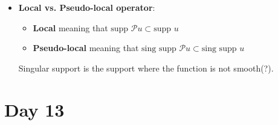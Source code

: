 \documentclass{article}
\begin{document}
\begin{itemize}
    \item \textbf{Local vs. Pseudo-local operator}:
    \begin{itemize}
        \item \textbf{Local} meaning that $\text{supp } \mathcal{P}u \subset \text{supp } u$
        \item \textbf{Pseudo-local} meaning that $\text{sing supp } \mathcal{P}u \subset \text{sing supp } u$
    \end{itemize}
    Singular support is the support where the function is not smooth(?).

\end{itemize}

\section*{Day 13}
\end{document}
